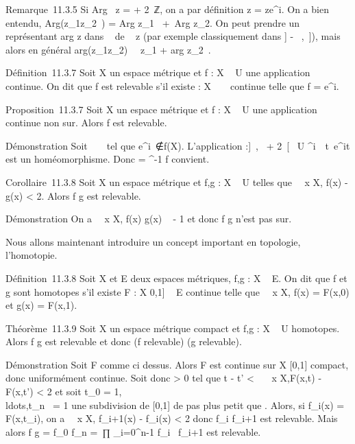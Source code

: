\documentclass[]{article}
\begin{document}
Remarque~11.3.5 Si Arg~ z = \theta + 2\pi~ℤ, on a par
définition z = \textbar{}z\textbar{}e^i\theta. On a bien entendu,
Arg(z\_1z\_2~)
= Arg z\_1~ + z\_2. On peut prendre un représentant
arg z dans ~ de \Arg~
z (par exemple classiquement dans {]} - \pi~,\pi~{]}), mais alors en général
arg(z\_1z\_2)\neq~\arg~
z\_1 + arg z\_2~.

Définition~11.3.7 Soit X un espace métrique et f : X \rightarrow~ U une application
continue. On dit que f est relevable s'il existe \phi : X \rightarrow~ \mathbb{R}~ continue
telle que f = e^i\phi.

Proposition~11.3.7 Soit X un espace métrique et f : X \rightarrow~ U une
application continue non sur\jmathective. Alors f est relevable.

Démonstration Soit \alpha~ \in {}~ tel que
e^i\alpha~∉f(X). L'application \omega :{]}\alpha~,\alpha~
+ 2\pi~{[}\rightarrow~ U \diagdown\e^i\alpha~\,
t\mapsto~e^it est un homéomorphisme. Donc
\phi = \omega^-1 \cdot f convient.

Corollaire~11.3.8 Soit X un espace métrique et f,g : X \rightarrow~ U telles que
\forall~~x \in X, \textbar{}f(x) - g(x)\textbar{}
\textless{} 2. Alors  f \over g est relevable.

Démonstration On a \forall~~x \in X, f(x)
\over g(x) \neq~ - 1 et donc 
f \over g n'est pas sur\jmathective.

Nous allons maintenant introduire un concept important en topologie,
l'homotopie.

Définition~11.3.8 Soit X et E deux espaces métriques, f,g : X \rightarrow~ E. On
dit que f et g sont homotopes s'il existe F : X \times {[}0,1{]} \rightarrow~ E continue
telle que \forall~~x \in X, f(x) = F(x,0) et g(x) =
F(x,1).

Théorème~11.3.9 Soit X un espace métrique compact et f,g : X \rightarrow~ U
homotopes. Alors  f \over g est relevable et donc (f
relevable) \Leftrightarrow (g relevable).

Démonstration Soit F comme ci dessus. Alors F est continue sur X \times
{[}0,1{]} compact, donc uniformément continue. Soit donc \eta
\textgreater{} 0 tel que \textbar{}t - t'\textbar{} \textless{} \eta
\rigtharrow~\forall~~x \in X,\textbar{}F(x,t) - F(x,t')\textbar{}
\textless{} 2 et soit t\_0 =
1,\\ldots,t\_n~
= 1 une subdivision de {[}0,1{]} de pas plus petit que \eta. Alors, si
f\_i(x) = F(x,t\_i), on a \forall~~x \in
X, \textbar{}f\_i+1(x) - f\_i(x)\textbar{} \textless{} 2
donc  f\_i \over f\_i+1 est
relevable. Mais alors  f \over g = f\_0
\over f\_n =\
∏  \_i=0^n-1 f\_i~
\over f\_i+1 est relevable.
\end{document}
